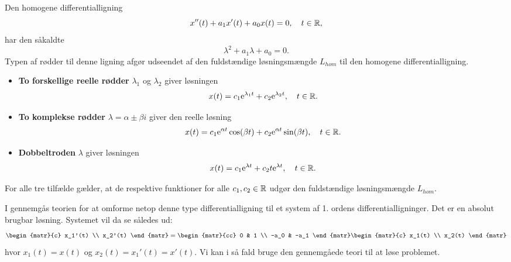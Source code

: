 \begin{theorem} \label{saet.difflig2.hom1}
Den homogene differentialligning
\begin{equation}
x''(t) + a_1x'(t) + a_0x(t) = 0, \quad t \in \mathbb{R}, \label{lig.difflig2.hom1}
\end{equation}
har den såkaldte 
\begin{equation}
\lambda^2 + a_1 \lambda + a_0 = 0.
\end{equation}
Typen af rødder til denne ligning afgør udseendet af den fuldstændige løsningsmængde $ L_{hom} $ til den homogene differentialligning.
\begin{itemize}
\item \textbf{To forskellige reelle rødder} $ \lambda_1 $ og $ \lambda_2 $ giver løsningen 
\begin{equation}
x(t) = c_1\mathrm{e}^{\lambda_1 t} + c_2\mathrm{e}^{\lambda_2 t}, \quad t \in \mathbb{R}.
\end{equation}
\item \textbf{To komplekse rødder} $ \lambda = \alpha \pm \beta i $ giver den reelle løsning
\begin{equation} \label{lig.kompl1}
x(t) = c_1\mathrm{e}^{\alpha t}\cos(\beta t) + c_2\mathrm{e}^{\alpha t}\sin(\beta t), \quad t \in \mathbb{R}.
\end{equation}
\item \textbf{Dobbeltroden} $ \lambda $ giver løsningen
\begin{equation}
x(t) = c_1\mathrm{e}^{\lambda t} + c_2 t \mathrm{e}^{\lambda t}, \quad t \in \mathbb{R}.
\end{equation}
\end{itemize}
For alle tre tilfælde gælder, at de respektive funktioner for alle $ c_1,c_2 \in \mathbb{R} $ udgør den fuldstændige løsningsmængde $ L_{hom} $.
\end{theorem}

\begin{info}
I  gennemgås teorien for at omforme netop denne type differentialligning til et system af 1. ordens differentialligninger. Det er en absolut brugbar løsning. Systemet vil da se således ud:
\begin{equation}
\begin{matr}{c} x_1'(t) \\ x_2'(t) \end{matr} = \begin{matr}{cc} 0 & 1 \\ -a_0 & -a_1 \end{matr} \begin{matr}{c} x_1(t) \\ x_2(t) \end{matr}
\end{equation}
hvor $ x_1(t) = x(t) $ og $ x_2(t) = x_1'(t) = x'(t) $. Vi kan i så fald bruge den gennemgåede teori til at løse problemet.
\end{info}

